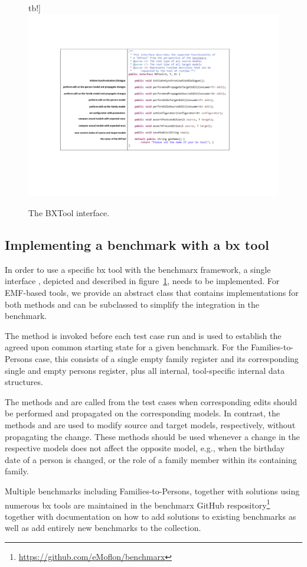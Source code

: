 \begin{figure}tb!]
	\centering
	\includegraphics[width=\columnwidth]{diagrams/BXTool}
	\caption{The BXTool interface.}
	\label{fig:refImplementation}
\end{figure}

\subsection{Implementing a benchmark with a bx tool}

In order to use a specific bx tool with the benchmarx framework, a single interface , depicted and described in figure~\ref{fig:refImplementation}, needs to be implemented.
For EMF-based tools, we provide an abstract class  that contains implementations for both  methods and can be subclassed to simplify the integration in the benchmark.

The method  is invoked before each test case run and is used to establish the agreed upon common starting state for a given benchmark.
For the Families-to-Persons case, this consists of a single empty family register and its corresponding single and empty persons register, plus all internal, tool-specific internal data structures. 

The methods  and  are called from the test cases when corresponding edits should be performed and propagated on the corresponding models. 
In contrast, the methods  and  are used to modify source and target models, respectively, without propagating the change.
These methods should be used whenever a change in the respective models does not affect the opposite model, e.g., when the birthday date of a person is changed, or the role of a family member within its containing family.

Multiple benchmarks including Families-to-Persons, together with solutions using numerous bx tools are maintained in the benchmarx GitHub respository\footnote{\url{https://github.com/eMoflon/benchmarx}} together with documentation on how to add solutions to existing benchmarks as well as add entirely new benchmarks to the collection.
